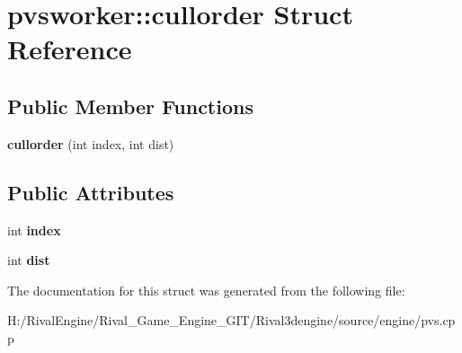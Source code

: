 \hypertarget{structpvsworker_1_1cullorder}{}\section{pvsworker\+:\+:cullorder Struct Reference}
\label{structpvsworker_1_1cullorder}
\subsection*{Public Member Functions}
\begin{DoxyCompactItemize}
\item 
\mbox{\label{structpvsworker_1_1cullorder_a332e18a6cedaf51e6bd711cd2bf50cdb}} 
{\bfseries cullorder} (int index, int dist)
\end{DoxyCompactItemize}
\subsection*{Public Attributes}
\begin{DoxyCompactItemize}
\item 
\mbox{\label{structpvsworker_1_1cullorder_a20779f2da2668ecbfb27bfe750093595}} 
int {\bfseries index}
\item 
\mbox{\label{structpvsworker_1_1cullorder_a0cdfbbc89385ac504576c2d33b23f1aa}} 
int {\bfseries dist}
\end{DoxyCompactItemize}


The documentation for this struct was generated from the following file\+:\begin{DoxyCompactItemize}
\item 
H\+:/\+Rival\+Engine/\+Rival\+\_\+\+Game\+\_\+\+Engine\+\_\+\+G\+I\+T/\+Rival3dengine/source/engine/pvs.\+cpp\end{DoxyCompactItemize}
